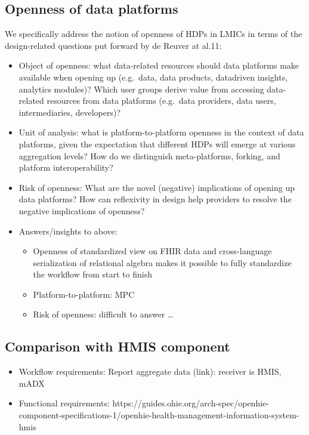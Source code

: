 \documentclass[
  authoryear]{elsarticle}
\providecommand{\tightlist}{%
  \setlength{\itemsep}{0pt}\setlength{\parskip}{0pt}}\usepackage{longtable,booktabs,array}
\begin{document}
\subsection{Openness of data
platforms}\label{openness-of-data-platforms}

We specifically address the notion of openness of HDPs in LMICs in terms
of the design-related questions put forward by de Reuver at al.11:

\begin{itemize}
\item
  Object of openness: what data-related resources should data platforms
  make available when opening up (e.g.~data, data products, datadriven
  insights, analytics modules)? Which user groups derive value from
  accessing data-related resources from data platforms (e.g.~data
  providers, data users, intermediaries, developers)?
\item
  Unit of analysis: what is platform-to-platform openness in the context
  of data platforms, given the expectation that different HDPs will
  emerge at various aggregation levels? How do we distinguish
  meta-platforms, forking, and platform interoperability?
\item
  Risk of openness: What are the novel (negative) implications of
  opening up data platforms? How can reflexivity in design help
  providers to resolve the negative implications of openness?
\item
  Answers/insights to above:

  \begin{itemize}
  \tightlist
  \item
    Openness of standardized view on FHIR data and cross-language
    serialization of relational algebra makes it possible to fully
    standardize the workflow from start to finish
  \item
    Platform-to-platform: MPC
  \item
    Risk of openness: difficult to answer \ldots{}
  \end{itemize}
\end{itemize}

\subsection{Comparison with HMIS
component}\label{comparison-with-hmis-component}

\begin{itemize}
\tightlist
\item
  Workflow requirements: Report aggregate data (link): receiver is HMIS,
  mADX
\item
  Functional requirements:
  https://guides.ohie.org/arch-spec/openhie-component-specifications-1/openhie-health-management-information-system-hmis
\end{itemize}
\end{document}
